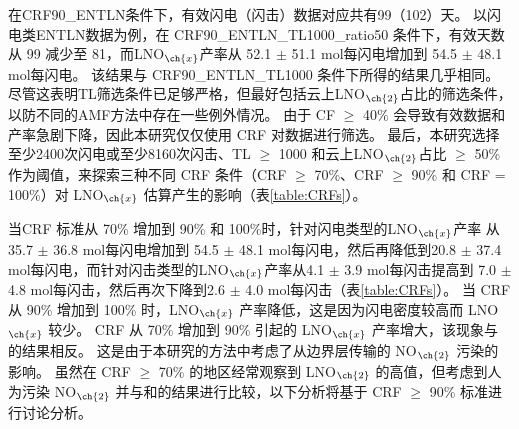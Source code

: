 在CRF90\_ENTLN条件下，有效闪电（闪击）数据对应共有99（102）天。
以闪电类ENTLN数据为例，在 CRF90\_ENTLN\_TL1000\_ratio50 条件下，有效天数从 99 减少至 81，而LNO$_{\ch{x}}$产率从 52.1 $\pm$ 51.1 mol每闪电增加到 54.5 $\pm$ 48.1 mol每闪电。
该结果与 CRF90\_ENTLN\_TL1000 条件下所得的结果几乎相同。
尽管这表明TL筛选条件已足够严格，但最好包括云上LNO$_{\ch{2}}$占比的筛选条件，以防不同的AMF方法中存在一些例外情况。
由于 CF $\geq$ 40\% 会导致有效数据和产率急剧下降，因此本研究仅仅使用 CRF 对数据进行筛选。
最后，本研究选择至少2400次闪电或至少8160次闪击、TL $\geq$ 1000 和云上LNO$_{\ch{2}}$占比 $\geq$ 50\% 作为阈值，来探索三种不同 CRF 条件（CRF $\geq$ 70\%、CRF $\geq$ 90\% 和 CRF = 100\%）对 LNO$_{\ch{x}}$ 估算产生的影响（表\ref{table:CRFs}）。

当CRF 标准从 70\% 增加到 90\% 和 100\%时，针对闪电类型的LNO$_{\ch{x}}$产率 从35.7 $\pm$ 36.8 mol每闪电增加到 54.5 $\pm$ 48.1 mol每闪电，然后再降低到20.8 $\pm$ 37.4 mol每闪电，而针对闪击类型的LNO$_{\ch{x}}$产率从4.1 $\pm$ 3.9 mol每闪击提高到 7.0 $\pm$ 4.8 mol每闪击，然后再次下降到2.6 $\pm$ 4.0 mol每闪击（表\ref{table:CRFs}）。
当 CRF 从 90\% 增加到 100\% 时，LNO$_{\ch{x}}$ 产率降低，这是因为闪电密度较高而 LNO$_{\ch{x}}$ 较少。
CRF 从 70\% 增加到 90\% 引起的 LNO$_{\ch{x}}$ 产率增大，该现象与\citet{Pickering.2016}的结果相反。
这是由于本研究的方法中考虑了从边界层传输的 NO$_{\ch{2}}$ 污染的影响。
虽然在 CRF $\geq$ 70\% 的地区经常观察到 LNO$_{\ch{2}}$ 的高值\citep{Pickering.2016}，但考虑到人为污染 NO$_{\ch{2}}$ 并与\citet{Pickering.2016}和\citet{Lapierre.2020}的结果进行比较，以下分析将基于 CRF $\geq$ 90\% 标准进行讨论分析。


